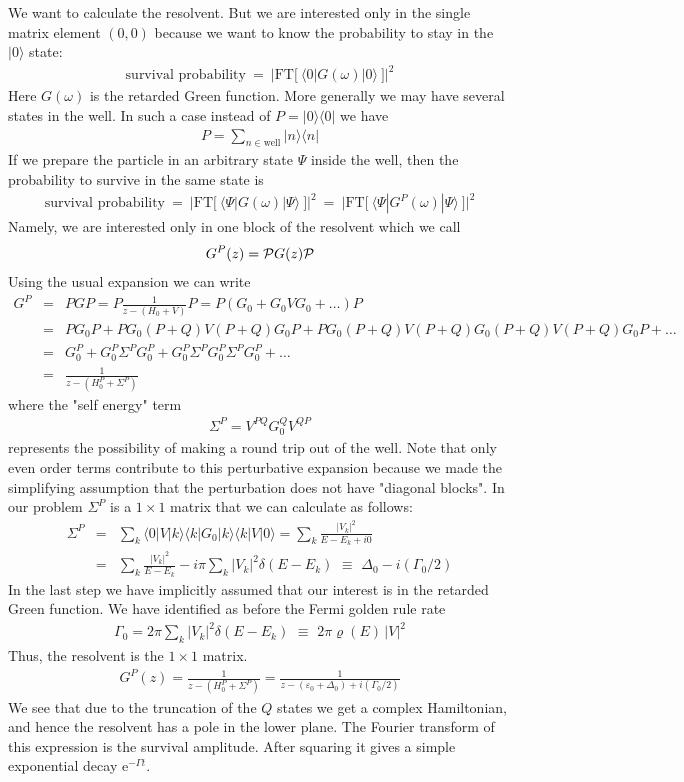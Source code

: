 \documentclass[onecolumn,fleqn]{revtex4}
\newcommand{\eexp}{\mathrm{e}^}
\newcommand{\gdos}{\varrho} \newcommand{\EPS}{\mathcal{E}}
\newcommand{\beq}{\begin{eqnarray}}
\newcommand{\eeq}{\end{eqnarray}}
\begin{document}
We want to calculate the resolvent.
But we are interested only in the single matrix element $(0,0)$ 
because we want to know the probability to stay 
in the $|0\rangle$ state: 
\beq 
\mbox{survival probability} \ = \  
\Big| \mbox{FT} \Big[ \ \langle 0  | G(\omega)  |0  \rangle \ \Big] \Big|^2
\eeq
Here $G(\omega)$ is the retarded Green function. 
More generally we may have several states in the well. 
In such a case instead of $P=|0 \rangle \langle 0|$ 
we have 
\beq 
P=\sum_{n\in \mbox{well}}  |n\rangle \langle n| 
\eeq
If we prepare the particle in an arbitrary state $\Psi$ 
inside the well, then the probability to survive 
in the same state is 
\beq 
\mbox{survival probability} \ = \  
\Big| \mbox{FT} \Big[ \ \langle \Psi  | G(\omega)  | \Psi  \rangle \ \Big] \Big|^2
\ = \ 
\Big| \mbox{FT} \Big[ \ \langle \Psi  | G^P(\omega)  | \Psi  \rangle \ \Big] \Big|^2
\eeq
Namely, we are interested only in one block of the resolvent which we call 
\beq
G^P(z) = {\cal P} G(z) {\cal P}
\eeq
Using the usual expansion we can write 
\beq 
G^P &=& PGP 
= P\frac{1}{z-(H_0+V)}P
= P(G_0 + G_0 V G_0 + \dots )P 
\\ \nonumber
&=& PG_0P + PG_0(P+Q)V(P+Q)G_0 P + PG_0(P+Q)V(P+Q)G_0(P+Q)V(P+Q)G_0P+\dots  
\\ \nonumber
&=& G_0^P + G_0^P \Sigma^P G_0^P+G_0^P \Sigma^P G_0^P \Sigma^P G_0^P +\dots  
\\ \nonumber
&=& \frac{1}{z-(H_0^P+\Sigma^P)}
\eeq
where the "self energy" term 
\beq
\Sigma^P = V^{PQ} G_0^Q V^{QP} 
\eeq
represents the possibility of making a round trip out of the well.
Note that only even order terms contribute to this perturbative expansion 
because we made the simplifying assumption  
that the perturbation does not have "diagonal blocks". 
In our problem $\Sigma^P$ is a $1\times 1$ matrix that 
we can calculate as follows: 
\beq 
{\Sigma}^P &=& \sum_k 
\langle 0 | V |k \rangle
\langle k | G_0 | k \rangle 
\langle k | V  |0 \rangle =
\sum_k \frac{|V_k|^2}{E-E_k+i0} 
\\ \nonumber
&=& 
\sum_k
\frac{|V_k|^2}{E-E_k} 
- i \pi \sum_k|V_k|^2 \delta (E-E_k) 
\,\,\equiv\,\,
\Delta_0 - i (\Gamma_0/2)
\eeq
In the last step we have implicitly assumed that our interest is in the retarded Green function. 
We have identified as before the Fermi golden rule rate 
\beq 
\Gamma_0 = 
2\pi \sum_k|V_k|^2 \delta (E-E_k) 
\,\,\equiv\,\,
2\pi \gdos(E) \, |V|^2 
\eeq
Thus, the resolvent is the $1\times 1$ matrix.
\beq 
G^P(z)  = \frac{1}{z-(H_0^P+{\Sigma}^P)}=
\frac{1}{z-(\varepsilon_0+\Delta_0)+i(\Gamma_0/2)} 
\eeq
We see that due to the truncation of the $Q$ states we get 
a complex Hamiltonian, and hence the resolvent 
has a pole in the lower plane. The Fourier transform 
of this expression is the survival amplitude. After squaring 
it gives a simple exponential decay $\eexp{-\Gamma t}$.
\end{document}
